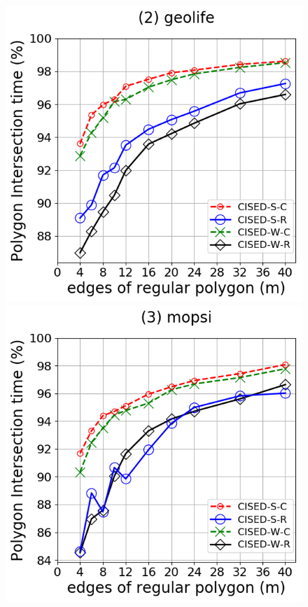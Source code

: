 \begin{figure}[tb!]
	\includegraphics[scale = 0.275]{Figures/Exp-M-poly-time-ratio-geolife.png}\hspace{3ex}
	\includegraphics[scale = 0.275]{Figures/Exp-M-poly-time-ratio-mopsi.png}\hspace{3ex}

\end{figure}

